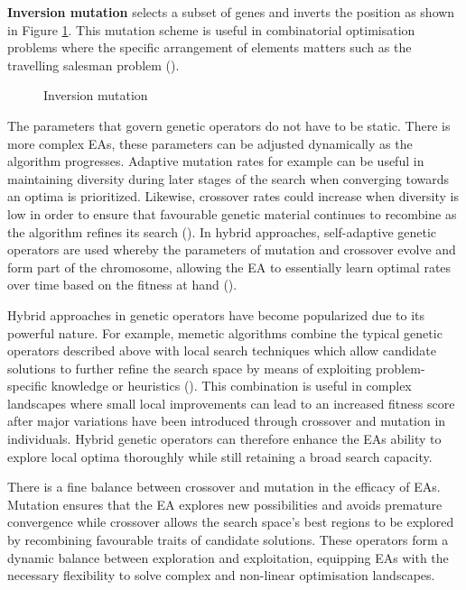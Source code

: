 \parbreak\noindent \textbf{Inversion mutation} selects a subset of genes and inverts the position as shown in Figure \ref{fig:inversion}. This mutation scheme is useful in combinatorial optimisation problems where the specific arrangement of elements matters such as the travelling salesman problem (\cite{intelligentOptimization}).
	
\parbreak
\begin{figure}[H] %
	\centering %
	\caption{Inversion mutation}
	\label{fig:inversion} %
\end{figure}

\parbreak\noindent The parameters that govern genetic operators do not have to be static. There is more complex EAs, these parameters can be adjusted dynamically as the algorithm progresses. Adaptive mutation rates for example can be useful in maintaining diversity during later stages of the search when converging towards an optima is prioritized. Likewise, crossover rates could increase when diversity is low in order to ensure that favourable genetic material continues to recombine as the algorithm refines its search (\cite{meyer2007self}). In hybrid approaches, self-adaptive genetic operators are used whereby the parameters of mutation and crossover evolve and form part of the chromosome, allowing the EA to essentially learn optimal rates over time based on the fitness at hand (\cite{meyer2007self}). 

\parbreak\noindent Hybrid approaches in genetic operators have become popularized due to its powerful nature. For example, memetic algorithms combine the typical genetic operators described above with local search techniques which allow candidate solutions to further refine the search space by means of exploiting problem-specific knowledge or heuristics (\cite{neri2012memetic}). This combination is useful in complex landscapes where small local improvements can lead to an increased fitness score after major variations have been introduced through crossover and mutation in individuals. Hybrid genetic operators can therefore enhance the EAs ability to explore local optima thoroughly while still retaining a broad search capacity.

\parbreak\noindent There is a fine balance between crossover and mutation in the efficacy of EAs. Mutation ensures that the EA explores new possibilities and avoids premature convergence while crossover allows the search space's best regions to be explored by recombining favourable traits of candidate solutions. These operators form a dynamic balance between exploration and exploitation, equipping EAs with the necessary flexibility to solve complex and non-linear optimisation landscapes.

